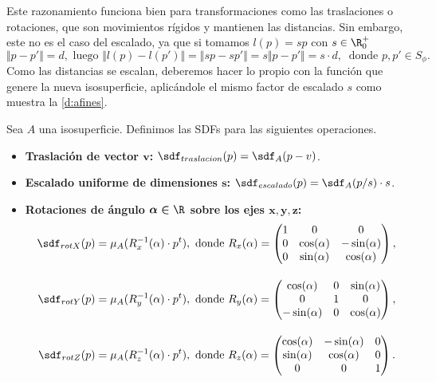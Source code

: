 Este razonamiento funciona bien para transformaciones como las traslaciones o rotaciones, que son movimientos rígidos y mantienen las distancias. Sin embargo, este no es el caso del escalado, ya que si tomamos $l(p) = sp$ con $s\in \R^+_0$
\begin{equation*}
    \Vert p-p'\Vert = d, \text{ luego }  \Vert l(p)-l(p')\Vert = \Vert sp-sp'\Vert = s\Vert p-p'\Vert = s\cdot d,\  \text{ donde } p,p' \in S_{\phi}.
\end{equation*}
Como las distancias se escalan, deberemos hacer lo propio con la función que genere la nueva isosuperficie, aplicándole el mismo factor de escalado $s$ como muestra la \autoref{d:afines}.

\begin{definicion}\label{d:afines}
    Sea $A$ una isosuperficie. Definimos las SDFs para las siguientes operaciones.
    \begin{itemize}
        \item \textbf{Traslación de vector $\boldsymbol{v}$: } $\sdf_{traslacion}(p) = \sdf_{A}(p - v)$.
        \item \textbf{Escalado uniforme de dimensiones $\boldsymbol{s}$: } $\sdf_{escalado}(p) = \sdf_{A}(p/s)\cdot s$.
        \item \textbf{Rotaciones de ángulo $\boldsymbol{\alpha\in \R}$ sobre los ejes $\boldsymbol{x,y,z}$: }
        \begin{align*}
            \sdf_{rotX}(p) &= \mu_{A}(R_x^{-1}(\alpha)\cdot p^t),\ \text{donde } R_x(\alpha) = 
            \begin{pmatrix}
                1&0&0\\
                0&\cos(\alpha) & -\sin(\alpha) \\
                0&\sin(\alpha) & \cos(\alpha) 
                \end{pmatrix},\\[10pt] 
            \sdf_{rotY}(p) &= \mu_{A}(R_y^{-1}(\alpha)\cdot p^t),\ \text{donde } R_y(\alpha) = \begin{pmatrix}
            \cos(\alpha) &0& \sin(\alpha)\\
            0&1&0\\
            -\sin(\alpha) &0& \cos(\alpha) 
            \end{pmatrix},\\[10pt]
            \sdf_{rotZ}(p) &= \mu_{A}(R_z^{-1}(\alpha)\cdot p^t),\ \text{donde } R_z(\alpha) = \begin{pmatrix}
            \cos(\alpha) & -\sin(\alpha) & 0\\
            \sin(\alpha) & \cos(\alpha) & 0\\
            0&0&1
            \end{pmatrix}.
        \end{align*}
    \end{itemize}
\end{definicion}

